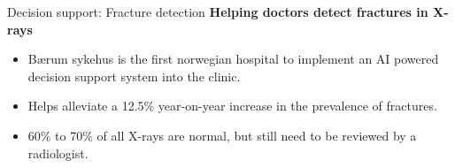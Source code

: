 \documentclass[8pt]{beamer}
\begin{document}
	\begin{frame}[t]{Decision support: Fracture detection}
		\textbf{Helping doctors detect fractures in X-rays}\\
		\begin{itemize}
			\item Bærum sykehus is the first norwegian hospital to implement an AI powered decision support system into the clinic.
			\item Helps alleviate a 12.5\% year-on-year increase in the prevalence of fractures.
			\item 60\% to 70\% of all X-rays are normal, but still need to be reviewed by a radiologist.
		\end{itemize}



\end{frame}
\end{document}

